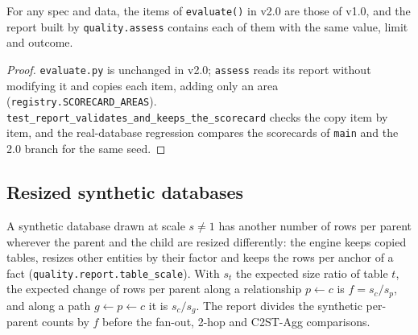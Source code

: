 \begin{proposition}\label{prop:carry}
For any spec and data, the items of \texttt{evaluate()} in v2.0 are those of v1.0, and the report built by \texttt{quality.assess} contains each of them with the same value, limit and outcome.
\end{proposition}
\begin{proof}
\texttt{evaluate.py} is unchanged in v2.0; \texttt{assess} reads its report without modifying it and copies each item, adding only an area (\texttt{registry.SCORECARD\_AREAS}). \texttt{test\_report\_validates\_and\_keeps\_the\_scorecard} checks the copy item by item, and the real-database regression compares the scorecards of \texttt{main} and the 2.0 branch for the same seed.
\end{proof}

\subsection{Resized synthetic databases}
A synthetic database drawn at scale $s\neq1$ has another number of rows per parent wherever the parent and the child are resized differently: the engine keeps copied tables, resizes other entities by their factor and keeps the rows per anchor of a fact (\texttt{quality.report.table\_scale}). With $s_t$ the expected size ratio of table $t$, the expected change of rows per parent along a relationship $p\leftarrow c$ is $f=s_c/s_p$, and along a path $g\leftarrow p\leftarrow c$ it is $s_c/s_g$. The report divides the synthetic per-parent counts by $f$ before the fan-out, 2-hop and C2ST-Agg comparisons.

